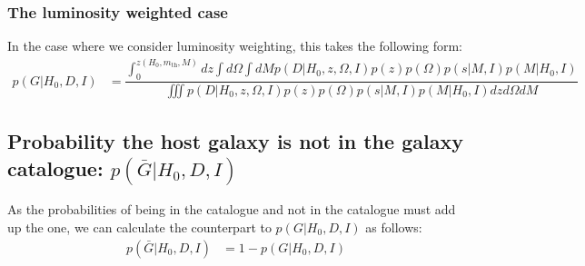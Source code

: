 \documentclass[a4paper,10pt]{article}
\begin{document}
\subsubsection{The luminosity weighted case}
In the case where we consider luminosity weighting, this takes the following form:
\begin{equation}
\begin{aligned}
p(G|H_0,D,I) &= \dfrac{\int^{z(H_0,m_{\text{th}},M)}_0 dz \int d\Omega \int dM p(D|H_0,z,\Omega,I) p(z)p(\Omega) p(s|M,I) p(M|H_0,I)}{\iiint p(D|H_0,z,\Omega,I) p(z)p(\Omega) p(s|M,I) p(M|H_0,I) dz d\Omega dM}
\end{aligned}
\end{equation}


\subsection{Probability the host galaxy is not in the galaxy catalogue: $p(\bar{G}|H_0,D,I)$}

As the probabilities of being in the catalogue and not in the catalogue must add up the one, we can calculate the counterpart to $p(G|H_0,D,I)$ as follows:
\begin{equation}
\begin{aligned}
p(\bar{G}|H_0,D,I) &= 1 - p(G|H_0,D,I)
\end{aligned}
\end{equation}
\end{document}
